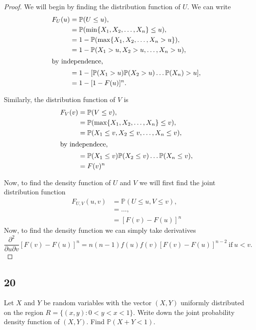 \documentclass{article}
\renewcommand{\P}[1]{\mathbb{P}(#1)}
\begin{document}
\begin{proof}
    We will begin by finding the distribution function of $U$.
    We can write
    \begin{align*}
        F_U(u) & = \P{U \leq u},                                \\
               & = \P{\min\{X_1,X_2,\dots,X_n\} \leq u},        \\
               & = 1 - \P{\max\{X_1,X_2,\dots,X_n > u\}},       \\
               & = 1 - \P{X_1 > u, X_2 > u,\dots,X_n > u},      \\
        \intertext{by independence,}
               & = 1 -[\P{X_1 > u}\P{X_2 > u}\dots\P{X_n} > u], \\
               & = 1 - [1 - F(u)]^n.
    \end{align*}

    Similarly, the distribution function of $V$ is
    \begin{align*}
        F_V(v) & = \P{V \leq v},                                    \\
               & = \P{\max\{X_1,X_2,\dots,X_n\} \leq v},            \\
               & = \P{X_1 \leq v, X_2 \leq v,\dots,X_n \leq v},     \\
        \intertext{by independece,}
               & = \P{X_1 \leq v}\P{X_2 \leq v}\dots\P{X_n \leq v}, \\
               & = F(v)^n
    \end{align*}

    Now, to find the density function of $U$ and $V$ we will first
    find the joint distribution function
    \begin{align*}
        F_{U,V}(u,v) & = \P{U \leq u, V \leq v}, \\
                     & = \dots,                  \\
                     & = [F(v) - F(u)]^n
    \end{align*}
    Now, to find the density function we can simply take derivatives
    \begin{equation*}
        \frac{\partial^2}{\partial u \partial v}[F(v) - F(u)]^n
        = n(n-1)f(u)f(v)[F(v)-F(u)]^{n-2} \ \text{if} \ u < v.
    \end{equation*}
\end{proof}

\subsection*{20}
Let $X$ and $Y$ be random variables with the vector $(X,Y)$ uniformly
distributed on the region $R= \{(x,y): 0<y<x<1\}$. Write down the joint
probability density function of $(X,Y)$. Find $\P{X+Y < 1}$.
\end{document}
